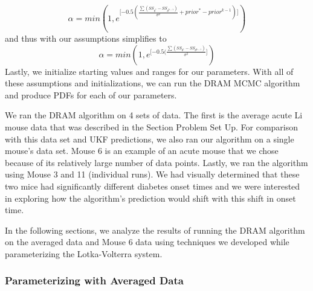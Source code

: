 \begin{equation} \label{eq:21mcmc}
\alpha = min(1, e^{ \lbrack {-0.5(\frac{\sum (SS_{\theta^*}-SS_{\theta^{k-1}})}{\sigma^2} + prior^*-prior^{k-1})} \rbrack}) 
\end{equation}
and thus with our assumptions simplifies to 
\begin{equation} \label{eq:22mcmc}
\alpha = min(1, e^{[ {-0.5(\frac{\sum (SS_{\theta^*}-SS_{\theta^{k-1}})}{\sigma^2}]}})
\end{equation}
Lastly, we initialize starting values and ranges for our parameters.
With all of these assumptions and initializations, we can run the DRAM MCMC algorithm and produce PDFs for each of our parameters.
\par We ran the DRAM algorithm on 4 sets of data. The first is the average acute Li mouse data that was described in the Section Problem Set Up. For comparison with this data set and UKF predictions, we also ran our algorithm on a single mouse's data set. Mouse 6 is an example of an acute mouse that we chose because of its relatively large number of data points. Lastly, we ran the algorithm using Mouse 3 and 11 (individual runs). We had visually determined that these two mice had significantly different diabetes onset times and we were interested in exploring how the algorithm's prediction would shift with this shift in onset time. 
\par In the following sections, we analyze the results of running the DRAM algorithm on the averaged data and Mouse 6 data using techniques we developed while parameterizing the Lotka-Volterra system.
\subsubsection{Parameterizing with Averaged Data}
